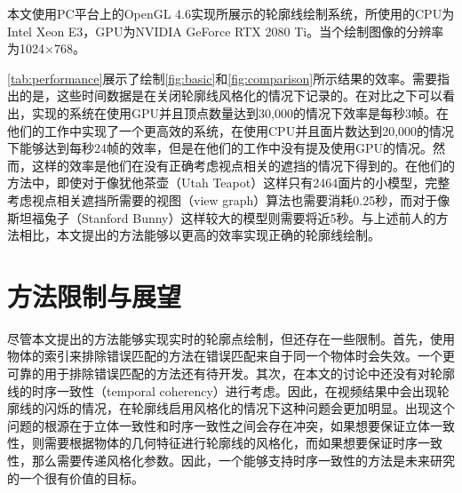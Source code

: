 本文使用PC平台上的OpenGL 4.6实现所展示的\stc{}轮廓线绘制系统，所使用的CPU为Intel Xeon E3，GPU为NVIDIA GeForce RTX 2080 Ti。当个绘制图像的分辨率为1024$\times$768。

\autoref{tab:performance}展示了绘制\autoref{fig:basic}和\autoref{fig:comparison}所示结果的效率。需要指出的是，这些时间数据是在关闭轮廓线风格化的情况下记录的。在对比之下可以看出，\citeauthor{kim2013stereoscopic}实现的系统\cite{kim2013stereoscopic}在使用GPU并且顶点数量达到30,000的情况下效率是每秒3帧。\citeauthor{bukenberger2018stereo}在他们的工作中实现了一个更高效的系统\cite{bukenberger2018stereo}，在使用CPU并且面片数达到20,000的情况下能够达到每秒24帧的效率，但是在他们的工作中没有提及使用GPU的情况。然而，这样的效率是他们在没有正确考虑视点相关的遮挡的情况下得到的。在他们的方法中，即使对于像犹他茶壶（Utah Teapot）这样只有2464面片的小模型，完整考虑视点相关遮挡所需要的视图（view graph）算法也需要消耗0.25秒，而对于像斯坦福兔子（Stanford Bunny）这样较大的模型则需要将近5秒。与上述前人的方法相比，本文提出的方法能够以更高的效率实现正确的\stc{}轮廓线绘制。

\section{方法限制与展望}

尽管本文提出的方法能够实现实时的\stc{}轮廓点绘制，但还存在一些限制。首先，使用物体的索引来排除错误匹配的方法在错误匹配来自于同一个物体时会失效。一个更可靠的用于排除错误匹配的方法还有待开发。其次，在本文的讨论中还没有对轮廓线的时序一致性（temporal coherency）进行考虑。因此，在视频结果中会出现轮廓线的闪烁的情况，在轮廓线启用风格化的情况下这种问题会更加明显。出现这个问题的根源在于立体一致性和时序一致性之间会存在冲突，如果想要保证立体一致性，则需要根据物体的几何特征进行轮廓线的风格化，而如果想要保证时序一致性，那么需要传递风格化参数。因此，一个能够支持时序一致性的方法是未来研究的一个很有价值的目标。